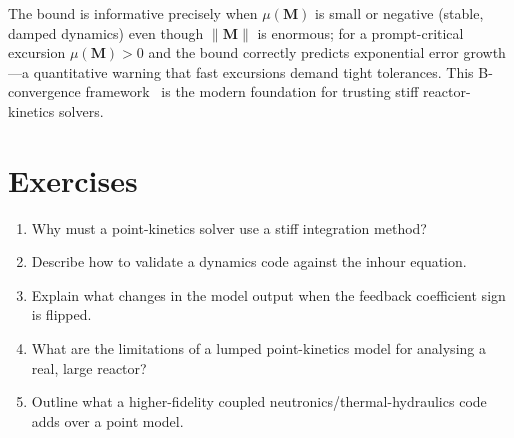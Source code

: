 The bound is informative precisely when $\mu(\mathbf M)$ is small or negative
(stable, damped dynamics) even though $\|\mathbf M\|$ is enormous; for a
prompt-critical excursion $\mu(\mathbf M)>0$ and the bound correctly predicts
exponential error growth---a quantitative warning that fast excursions demand
tight tolerances. This B-convergence framework~\cite{hairerwanner} is the modern
foundation for trusting stiff reactor-kinetics solvers.


\section*{Exercises}
\begin{enumerate}[leftmargin=*,itemsep=2pt]
\item Why must a point-kinetics solver use a stiff integration method?
\item Describe how to validate a dynamics code against the inhour equation.
\item Explain what changes in the model output when the feedback coefficient sign is flipped.
\item What are the limitations of a lumped point-kinetics model for analysing a real, large reactor?
\item Outline what a higher-fidelity coupled neutronics/thermal-hydraulics code adds over a point model.
\end{enumerate}
